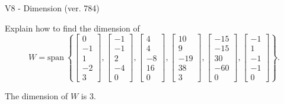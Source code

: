 \begin{exercise}
  \begin{exerciseTitle}V8 - Dimension (ver. 784)\end{exerciseTitle}
  \begin{exerciseStatement}
    Explain how to find the dimension of 
\[W=\mathrm{span}\ \left\{\left[\begin{array}{r}
0 \\
-1 \\
1 \\
-2 \\
3
\end{array}\right] , \left[\begin{array}{r}
-1 \\
-1 \\
2 \\
-4 \\
0
\end{array}\right] , \left[\begin{array}{r}
4 \\
4 \\
-8 \\
16 \\
0
\end{array}\right] , \left[\begin{array}{r}
10 \\
9 \\
-19 \\
38 \\
3
\end{array}\right] , \left[\begin{array}{r}
-15 \\
-15 \\
30 \\
-60 \\
0
\end{array}\right] , \left[\begin{array}{r}
-1 \\
1 \\
-1 \\
-1 \\
0
\end{array}\right]\right\}.\]



  \end{exerciseStatement}
  \begin{exerciseAnswer}
   The dimension of \(W\) is  \(3\).
  


  \end{exerciseAnswer}
\end{exercise}